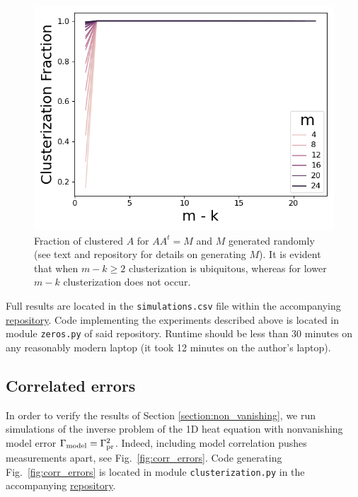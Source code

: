 \begin{figure}
    \centering
    \includegraphics[height=0.5\textwidth]{figs/simulations.png}
    \caption{Fraction of clustered $A$ for $AA^t = M$ and $M$
      generated randomly (see text and repository for details on
      generating $M$). It is evident that when $m-k \geq 2$ clusterization
      is ubiquitous, whereas for lower $m-k$ clusterization does not
      occur.}
  \label{fig:sim_AAt}
\end{figure}

Full results are located in the \texttt{simulations.csv} file within
the accompanying \href{https://github.com/yairdaon/OED}{repository}.
Code implementing the experiments described above is located in module
\texttt{zeros.py} of said repository. Runtime should be less than 30
minutes on any reasonably modern laptop (it took 12 minutes on the
author's laptop).


\subsection{Correlated errors}\label{subsec:corr_errors_sims}
In order to verify the results of Section \ref{section:non_vanishing},
we run simulations of the inverse problem of the 1D heat equation with
nonvanishing model error \(\Gamma_{\textup{model}} = \Gamma_{\textup{pr}}^2 \). Indeed, including
model correlation pushes measurements apart, see
Fig.~\ref{fig:corr_errors}. Code generating Fig.~\ref{fig:corr_errors}
is located in module \texttt{clusterization.py} in the accompanying
\href{https://github.com/yairdaon/OED}{repository}.


